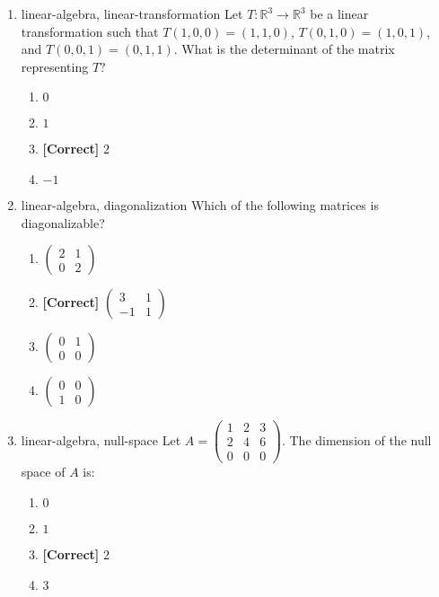 \documentclass{article}
\newenvironment{problem}{\item}{}
\newcommand{\choice}{\item}
\newcommand{\correctchoice}{\item \textbf{[Correct] }}
\newcommand{\tags}[1]{#1} %
\begin{document}
\begin{enumerate}
        \begin{problem}
            \tags{linear-algebra, linear-transformation}
            Let $T: \mathbb{R}^3 \to \mathbb{R}^3$ be a linear transformation such that $T(1,0,0) = (1,1,0)$, $T(0,1,0) = (1,0,1)$, and $T(0,0,1) = (0,1,1)$. What is the determinant of the matrix representing $T$?
            \begin{enumerate}
                \choice $0$
                \choice $1$
                \correctchoice $2$
                \choice $-1$
            \end{enumerate}
        \end{problem}
        
        \begin{problem}
            \tags{linear-algebra, diagonalization}
            Which of the following matrices is diagonalizable?
            \begin{enumerate}
                \choice $\begin{pmatrix} 2 & 1 \\ 0 & 2 \end{pmatrix}$
                \correctchoice $\begin{pmatrix} 3 & 1 \\ -1 & 1 \end{pmatrix}$
                \choice $\begin{pmatrix} 0 & 1 \\ 0 & 0 \end{pmatrix}$
                \choice $\begin{pmatrix} 0 & 0 \\ 1 & 0 \end{pmatrix}$
            \end{enumerate}
        \end{problem}
        
        \begin{problem}
            \tags{linear-algebra, null-space}
            Let $A = \begin{pmatrix} 1 & 2 & 3 \\ 2 & 4 & 6 \\ 0 & 0 & 0 \end{pmatrix}$. The dimension of the null space of $A$ is:
            \begin{enumerate}
                \choice $0$
                \choice $1$
                \correctchoice $2$
                \choice $3$
            \end{enumerate}
        \end{problem}
        

\end{enumerate}
\end{document}
